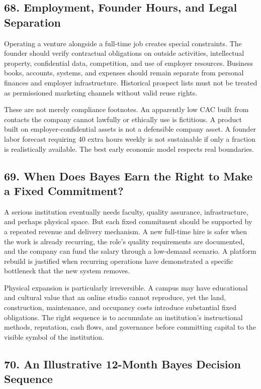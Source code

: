 \subsection*{68. Employment, Founder Hours, and Legal Separation}

Operating a venture alongside a full-time job creates special constraints. The founder should verify contractual obligations on outside activities, intellectual property, confidential data, competition, and use of employer resources. Business books, accounts, systems, and expenses should remain separate from personal finances and employer infrastructure. Historical prospect lists must not be treated as permissioned marketing channels without valid reuse rights.

These are not merely compliance footnotes. An apparently low CAC built from contacts the company cannot lawfully or ethically use is fictitious. A product built on employer-confidential assets is not a defensible company asset. A founder labor forecast requiring 40 extra hours weekly is not sustainable if only a fraction is realistically available. The best early economic model respects real boundaries.

\subsection*{69. When Does Bayes Earn the Right to Make a Fixed Commitment?}

A serious institution eventually needs faculty, quality assurance, infrastructure, and perhaps physical space. But each fixed commitment should be supported by a repeated revenue and delivery mechanism. A new full-time hire is safer when the work is already recurring, the role's quality requirements are documented, and the company can fund the salary through a low-demand scenario. A platform rebuild is justified when recurring operations have demonstrated a specific bottleneck that the new system removes.

Physical expansion is particularly irreversible. A campus may have educational and cultural value that an online studio cannot reproduce, yet the land, construction, maintenance, and occupancy costs introduce substantial fixed obligations. The right sequence is to accumulate an institution's instructional methods, reputation, cash flows, and governance before committing capital to the visible symbol of the institution.

\subsection*{70. An Illustrative 12-Month Bayes Decision Sequence}

